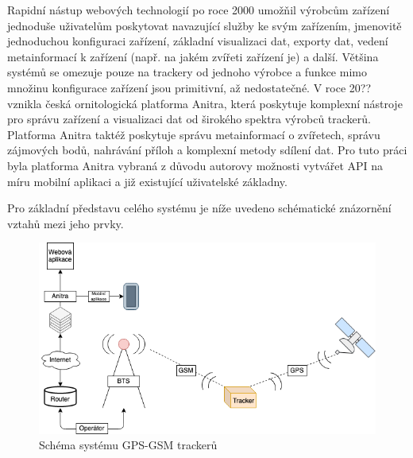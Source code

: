 Rapidní nástup webových technologií po roce 2000 umožňil výrobcům zařízení jednoduše uživatelům poskytovat navazující služby ke svým zařízením, jmenovitě jednoduchou konfiguraci zařízení, základní visualizaci dat, exporty dat, vedení metainformací k zařízení (např. na jakém zvířeti zařízení je) a další. Většina systémů se omezuje pouze na trackery od jednoho výrobce a funkce mimo množinu konfigurace zařízení jsou primitivní, až nedostatečné. V roce 20?? vznikla česká ornitologická platforma Anitra, která poskytuje komplexní nástroje pro správu zařízení a visualizaci dat od širokého spektra výrobců trackerů. Platforma Anitra taktéž poskytuje správu metainformací o zvířetech, správu zájmových bodů, nahrávání příloh a komplexní metody sdílení dat. Pro tuto práci byla platforma Anitra vybraná z důvodu autorovy možnosti vytvářet API na míru mobilní aplikaci a již existující uživatelské základny.

Pro základní představu celého systému je níže uvedeno schématické znázornění vztahů mezi jeho prvky.

\begin{figure}
	\includegraphics[width=\linewidth]{img/diagram_system.png}
	\caption{Schéma systému GPS-GSM trackerů}
	\label{fig:boat1}
\end{figure}